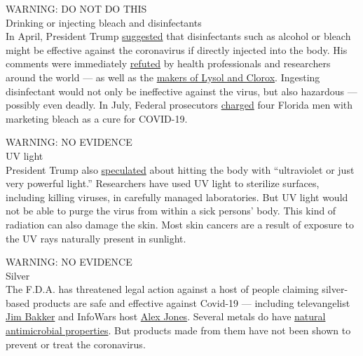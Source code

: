 WARNING: DO NOT DO THIS\\
Drinking or injecting bleach and disinfectants\\
In April, President Trump
\href{https://www.nytimes.com/2020/04/24/health/sunlight-coronavirus-trump.html}{suggested}
that disinfectants such as alcohol or bleach might be effective against
the coronavirus if directly injected into the body. His comments were
immediately
\href{https://www.nytimes.com/2020/04/24/us/politics/trump-inject-disinfectant-bleach-coronavirus.html}{refuted}
by health professionals and researchers around the world --- as well as
the
\href{https://www.prweek.com/article/1681380/lysol-clorox-respond-trump-comment-injecting-disinfectant}{makers
of Lysol and Clorox}. Ingesting disinfectant would not only be
ineffective against the virus, but also hazardous --- possibly even
deadly. In July, Federal prosecutors
\href{https://www.wtsp.com/article/news/regional/florida/miracle-mineral-solution-genesis-ii-church-of-health-and-healing/67-b33b7f2e-2b0c-4853-8434-90732359d730}{charged}
four Florida men with marketing bleach as a cure for COVID-19.

WARNING: NO EVIDENCE\\
UV light\\
President Trump also
\href{https://www.nytimes.com/2020/04/24/health/sunlight-coronavirus-trump.html}{speculated}
about hitting the body with ``ultraviolet or just very powerful light.''
Researchers have used UV light to sterilize surfaces, including killing
viruses, in carefully managed laboratories. But UV light would not be
able to purge the virus from within a sick persons' body. This kind of
radiation can also damage the skin. Most skin cancers are a result of
exposure to the UV rays naturally present in sunlight.

WARNING: NO EVIDENCE\\
Silver\\
The F.D.A. has threatened legal action against a host of people claiming
silver-based products are safe and effective against Covid-19 ---
including televangelist
\href{https://www.fda.gov/inspections-compliance-enforcement-and-criminal-investigations/warning-letters/jim-bakker-show-604820-03062020}{Jim
Bakker} and InfoWars host
\href{https://www.fda.gov/inspections-compliance-enforcement-and-criminal-investigations/warning-letters/free-speech-systems-llc-dba-infowarscom-605802-04092020}{Alex
Jones}. Several metals do have
\href{https://www.nytimes.com/article/copper-coronavirus-masks.html}{natural
antimicrobial properties}. But products made from them have not been
shown to prevent or treat the coronavirus.

